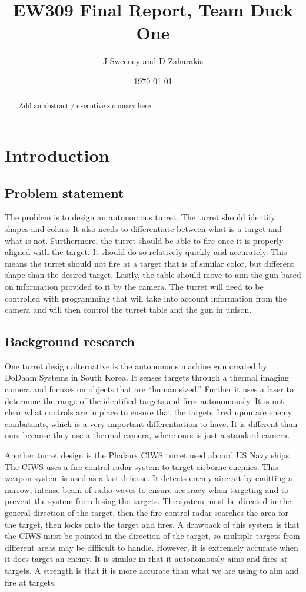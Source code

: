 \documentclass{article}
\title{EW309 Final Report, Team Duck One}
\author{J Sweeney and D Zaharakis}
\date{\today}
\begin{document}
\maketitle
\begin{abstract}
Add an abstract / executive summary here
\end{abstract}

\section{Introduction}

\subsection{Problem statement}
The problem is to design an autonomous turret. The turret should identify shapes and colors. It also needs to differentiate between what is a target and what is not. Furthermore, the turret should be able to fire once it is properly aligned with the target. It should do so relatively quickly and accurately. This means the turret should not fire at a target that is of similar color, but different shape than the desired target. Lastly, the table should move to aim the gun based on information provided to it by the camera. The turret will need to be controlled with programming that will take into account information from the camera and will then control the turret table and the gun in unison. 

\subsection{Background research}
One turret design alternative is the autonomous machine gun created by DoDaam Systems in South Korea. It senses targets through a thermal imaging camera and focuses on objects that are “human sized.” Further it uses a laser to determine the range of the identified targets and fires autonomously. It is not clear what controls are in place to ensure that the targets fired upon are enemy combatants, which is a very important differentiation to have. It is different than ours because they use a thermal camera, where ours is just a standard camera.

Another turret design is the Phalanx CIWS turret used aboard US Navy ships. The CIWS uses a fire control radar system to target airborne enemies. This weapon system is used as a last-defense. It detects enemy aircraft by emitting a narrow, intense beam of radio waves to ensure accuracy when targeting and to prevent the system from losing the targets. The system must be directed in the general direction of the target, then the fire control radar searches the area for the target, then locks onto the target and fires. A drawback of this system is that the CIWS must be pointed in the direction of the target, so multiple targets from different areas may be difficult to handle. However, it is extremely accurate when it does target an enemy. It is similar in that it autonomously aims and fires at targets. A strength is that it is more accurate than what we are using to aim and fire at targets.
\end{document}
